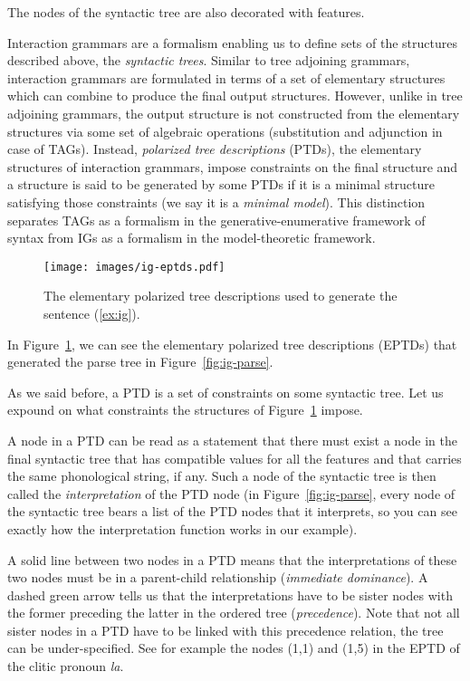 The nodes of the syntactic tree are also decorated with features.

Interaction grammars are a formalism enabling us to define sets of the
structures described above, the \emph{syntactic trees}. Similar to tree
adjoining grammars, interaction grammars are formulated in terms of a
set of elementary structures which can combine to produce the final
output structures. However, unlike in tree adjoining grammars, the
output structure is not constructed from the elementary structures via
some set of algebraic operations (substitution and adjunction in case of
TAGs). Instead, \emph{polarized tree descriptions} (PTDs), the
elementary structures of interaction grammars, impose constraints on the
final structure and a structure is said to be generated by some PTDs if
it is a minimal structure satisfying those constraints (we say it is a
\emph{minimal model}). This distinction separates TAGs as a formalism in
the generative-enumerative framework of syntax from IGs as a formalism
in the model-theoretic framework.

\begin{figure}
  \centering
  \texttt{[image: images/ig-eptds.pdf]}
  \caption{\label{fig:ig-eptds} The elementary polarized tree
    descriptions used to generate the sentence (\ref{ex:ig}).}
\end{figure}

In Figure~\ref{fig:ig-eptds}, we can see the elementary polarized tree
descriptions (EPTDs) that generated the parse tree in
Figure~\ref{fig:ig-parse}.

As we said before, a PTD is a set of constraints on some syntactic
tree. Let us expound on what constraints the structures of
Figure~\ref{fig:ig-eptds} impose.

A node in a PTD can be read as a statement that there must exist a node
in the final syntactic tree that has compatible values for all the
features and that carries the same phonological string, if any. Such a
node of the syntactic tree is then called the \emph{interpretation} of
the PTD node (in Figure~\ref{fig:ig-parse}, every node of the syntactic
tree bears a list of the PTD nodes that it interprets, so you can see
exactly how the interpretation function works in our example).

A solid line between two nodes in a PTD means that the interpretations
of these two nodes must be in a parent-child relationship
(\emph{immediate dominance}). A dashed green arrow tells us that the
interpretations have to be sister nodes with the former preceding the
latter in the ordered tree (\emph{precedence}). Note that not all sister
nodes in a PTD have to be linked with this precedence relation, the tree
can be under-specified. See for example the nodes (1,1) and (1,5) in the
EPTD of the clitic pronoun \emph{la}.

